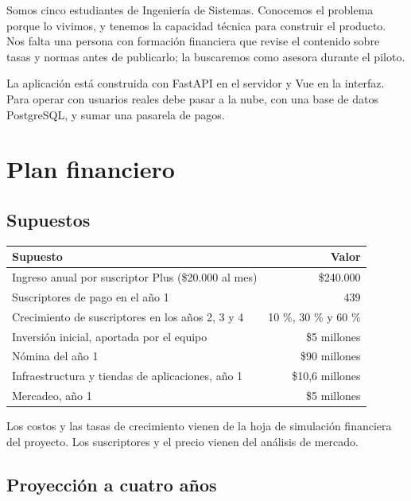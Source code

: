 \documentclass[11pt,a4paper]{article}
\begin{document}
Somos cinco estudiantes de Ingeniería de Sistemas. Conocemos el problema porque lo vivimos, y tenemos la capacidad técnica para construir el producto. Nos falta una persona con formación financiera que revise el contenido sobre tasas y normas antes de publicarlo; la buscaremos como asesora durante el piloto.

La aplicación está construida con FastAPI en el servidor y Vue en la interfaz. Para operar con usuarios reales debe pasar a la nube, con una base de datos PostgreSQL, y sumar una pasarela de pagos.

\section{Plan financiero}

\subsection{Supuestos}

\begin{tabularx}{\textwidth}{X r}
  \toprule
  \textbf{Supuesto} & \textbf{Valor} \\
  \midrule
  Ingreso anual por suscriptor Plus (\$20.000 al mes) & \$240.000 \\
  Suscriptores de pago en el año 1 & 439 \\
  Crecimiento de suscriptores en los años 2, 3 y 4 & 10 \%, 30 \% y 60 \% \\
  Inversión inicial, aportada por el equipo & \$5 millones \\
  Nómina del año 1 & \$90 millones \\
  Infraestructura y tiendas de aplicaciones, año 1 & \$10,6 millones \\
  Mercadeo, año 1 & \$5 millones \\
  \bottomrule
\end{tabularx}

Los costos y las tasas de crecimiento vienen de la hoja de simulación financiera del proyecto. Los suscriptores y el precio vienen del análisis de mercado.

\subsection{Proyección a cuatro años}
\end{document}
